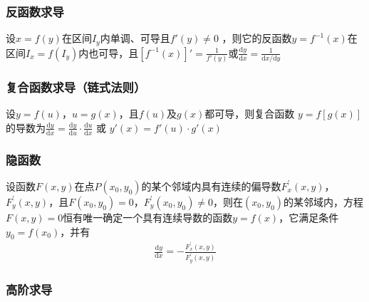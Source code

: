 \documentclass[12pt]{book}
\begin{document}
\subsubsection{反函数求导}

设$ x=f(y) $在区间$ I_y $内单调、可导且$ f'(y)\ne 0$ ，则它的反函数$ y=f^{-1}(x) $在区间$ I_x=f(I_y) $内也可导，且$ [f^{-1}(x)]'=\frac{1}{f'(y)} $或$ \frac{\mathrm{d}y}{\mathrm{d}{x}}=\frac{1}{\mathrm{d}x/\mathrm{d}y}$ 

\subsubsection{复合函数求导（链式法则）}

设$ y=f(u) $，$ u=g(x) $，且$ f(u) $及$ g(x) $都可导，则复合函数 $y=f[g(x)] $的导数为$ \frac{\mathrm{d}y}{\mathrm{d}x}=\frac{\mathrm{d}y}{\mathrm{d}u}\cdot \frac{\mathrm{d}u}{\mathrm{d}x} $ 或 $y'(x)=f'(u)\cdot g'(x) $

\subsubsection{隐函数}


设函数$F(x,y)$在点$P(x_0,y_0)$的某个邻域内具有连续的偏导数$F^{\prime}_{x}(x,y)$，$F^{\prime}_{y}(x,y)$，且$F(x_0,y_0)=0$，$F^{\prime}_{y}(x_0,y_0)\neq 0$，则在$(x_0,y_0)$的某邻域内，方程$F(x,y)=0$恒有唯一确定一个具有连续导数的函数$y=f(x)$，它满足条件$y_{0}=f(x_0)$，并有
\begin{gather*}
    \frac{\mathrm{d}y}{\mathrm{d}x}=-\frac{F^{\prime}_{x}(x,y)}{F^{\prime}_{y}(x,y)}
\end{gather*}




\subsubsection{高阶求导}
\end{document}
